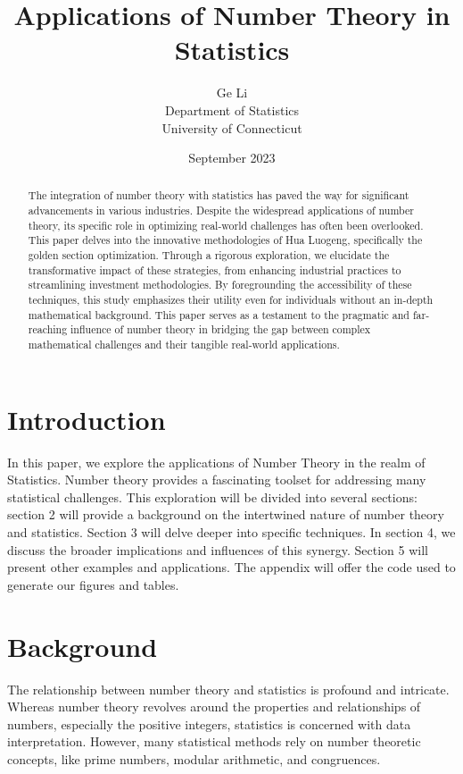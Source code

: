 \documentclass{article}
\title{Applications of Number Theory in Statistics}
\author{
Ge Li \\
Department of Statistics \\
University of Connecticut}
\date{September 2023}
\begin{document}
\maketitle

\begin{abstract}
The integration of number theory with statistics has paved the way for significant advancements in various industries. Despite the widespread applications of number theory, its specific role in optimizing real-world challenges has often been overlooked. This paper delves into the innovative methodologies of Hua Luogeng, specifically the golden section optimization. Through a rigorous exploration, we elucidate the transformative impact of these strategies, from enhancing industrial practices to streamlining investment methodologies. By foregrounding the accessibility of these techniques, this study emphasizes their utility even for individuals without an in-depth mathematical background. This paper serves as a testament to the pragmatic and far-reaching influence of number theory in bridging the gap between complex mathematical challenges and their tangible real-world applications.
\end{abstract}

\section{Introduction}
In this paper, we explore the applications of Number Theory in the realm of Statistics. Number theory provides a fascinating toolset for addressing many statistical challenges. This exploration will be divided into several sections: section 2 will provide a background on the intertwined nature of number theory and statistics. Section 3 will delve deeper into specific techniques. In section 4, we discuss the broader implications and influences of this synergy. Section 5 will present other examples and applications. The appendix will offer the code used to generate our figures and tables.

\section{Background}
The relationship between number theory and statistics is profound and intricate. Whereas number theory revolves around the properties and relationships of numbers, especially the positive integers, statistics is concerned with data interpretation. However, many statistical methods rely on number theoretic concepts, like prime numbers, modular arithmetic, and congruences.
\end{document}
